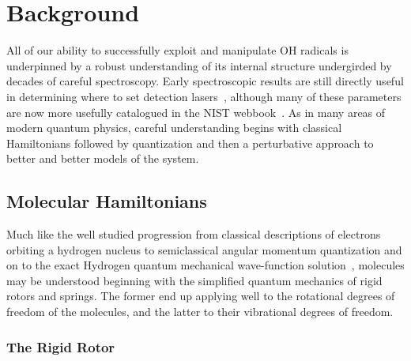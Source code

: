 \ifx\justbeingincluded\undefined

\fi

\chapter{Background}
\label{chapter:Background}

All of our ability to successfully exploit and manipulate OH radicals is underpinned by a robust understanding of its internal structure undergirded by decades of careful spectroscopy.
Early spectroscopic results are still directly useful in determining where to set detection lasers~\cite{Meerts1975}, although many of these parameters are now more usefully catalogued in the NIST webbook~\cite{Huber2018}.
As in many areas of modern quantum physics, careful understanding begins with classical Hamiltonians followed by quantization and then a perturbative approach to better and better models of the system. 

\section{Molecular Hamiltonians}

Much like the well studied progression from classical descriptions of electrons orbiting a hydrogen nucleus to semiclassical angular momentum quantization and on to the exact Hydrogen quantum mechanical wave-function solution~\citep[Sec.~4.2]{Griffiths2018}, molecules may be understood beginning with the simplified quantum mechanics of rigid rotors and springs.
The former end up applying well to the rotational degrees of freedom of the molecules, and the latter to their vibrational degrees of freedom.


\subsection{The Rigid Rotor}

